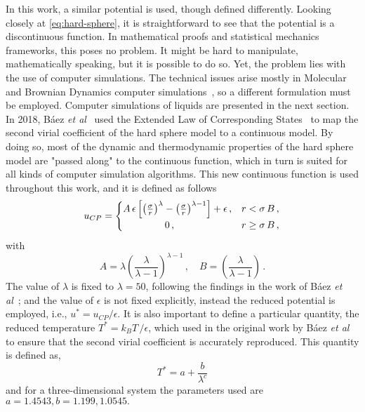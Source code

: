 In this work, a similar potential is used, though defined differently. Looking closely
at \autoref{eq:hard-sphere}, it is straightforward to see that the potential is a
discontinuous function. In mathematical proofs and statistical mechanics frameworks,
this poses no problem. It might be hard to manipulate, mathematically speaking,
but it is possible to do so. Yet, the problem lies with the use of computer simulations.
The technical issues arise mostly in Molecular and Brownian Dynamics computer
simulations~\cite{allenComputerSimulationLiquids2017}, so a different formulation
must be employed. Computer simulations of liquids are presented in the next section.
In 2018, Báez \emph{et al}~\cite{baezUsingSecondVirial2018} used the Extended Law
of Corresponding States~\cite{valadez-perezReversibleAggregationColloidal2018}
to map the second virial coefficient of the hard sphere model to a continuous
model. By doing so, most of the dynamic and thermodynamic properties of the hard sphere
model are "passed along" to the continuous function, which in turn is suited for all
kinds of computer simulation algorithms. This new continuous function is used
throughout this work, and it is defined as follows
\begin{equation}
    u_{CP} = 
    \begin{cases}
        A \, \epsilon \left[ {\left(\frac{\sigma}{r}\right)}^{\lambda} -
        {\left(\frac{\sigma}{r}\right)}^{\lambda - 1} \right] + \epsilon \, , 
        &r < \sigma \, B \, , \\
        \hspace{1.5cm} 0 \, , &r \geq \sigma \, B \, ,
    \end{cases}
    \label{eq:cont-hs}
\end{equation}
with
\begin{equation}
    A = \lambda {\left(\frac{\lambda}{\lambda -1}\right)}^{\lambda - 1} \, ,
    \quad
    B = \left(\frac{\lambda}{\lambda -1}\right) \, .
    \label{eq:ab-params}
\end{equation}
The value of $\lambda$ is fixed to $\lambda=50$, following the findings in the work of
Báez \emph{et al}~\cite{baezUsingSecondVirial2018}; and the value of $\epsilon$ is
not fixed explicitly, instead the reduced potential is employed, 
i.e., $u^{*}=u_{CP} / \epsilon$. It is also important to define a particular quantity,
the reduced temperature \(T^{*}=k_{B} T \, / \epsilon\), which used in the original work
by Báez \emph{et al} to ensure that the second virial coefficient is accurately reproduced.
This quantity is defined as,
\begin{equation}
    T^{*} = a + \frac{b}{\lambda^c}
    \label{eq:t-star}
\end{equation}
and for a three-dimensional system the parameters used are \(a=1.4543, b=1.199, 1.0545 .\)

